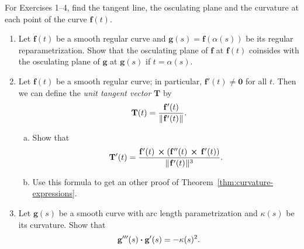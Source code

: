 \startexercises\label{sec1dot9}
\par\noindent For Exercises 1--4, 
find the tangent line, 
the osculating plane and the curvature at each point of the curve  $\mathbf{f}(t)$.
\begin{enumerate}[\bfseries 1.]


  
[{[\bfseries 1.]}]
  \item Let $\mathbf{f}(t)$ be a smooth regular curve and $\mathbf{g}(s)=\mathbf{f}(\alpha(s))$ be its regular reparametrization. Show that the osculating plane of $\mathbf{f}$ at $\mathbf{f}(t)$ coinsides with the osculating plane of $\mathbf{g}$ at $\mathbf{g}(s)$ if $t=\alpha(s)$.  
  
   \item Let $\mathbf{f}(t)$ be a smooth regular curve; in particular, $\mathbf{f}'(t) \ne \mathbf{0}$ for all $t$. Then we can
  define the \emph{unit tangent vector} $\mathbf{T}$ by
  \begin{displaymath}
   \mathbf{T}(t) = \dfrac{\mathbf{f}'(t)}{\lVert\mspace{1mu}\mathbf{f}'(t)\mspace{1mu}\rVert} .
  \end{displaymath}
\begin{enumerate}[(a)]
\item Show that
\begin{displaymath}
\mathbf{T}'(t) = \dfrac{\mathbf{f}'(t)\, \bm{\times} (\mathbf{f}''(t)\, \bm{\times} \,\mathbf{f}'(t))}{
\lVert\mspace{1mu}\mathbf{f}'(t)\mspace{1mu}\rVert^3} .
\end{displaymath}

\item Use this formula to get an other proof of Theorem~\ref{thm:curvature-expressions}.
\end{enumerate}

\item\label{ex:g'''} Let $\mathbf{g}(s)$ be a smooth curve with arc length parametrization and $\kappa(s)$ be its curvature.
  Show that 
  \[\mathbf{g}'''(s) \bm{\cdot} \mathbf{g}'(s)=-\kappa(s)^2.\]
  

\end{enumerate}
